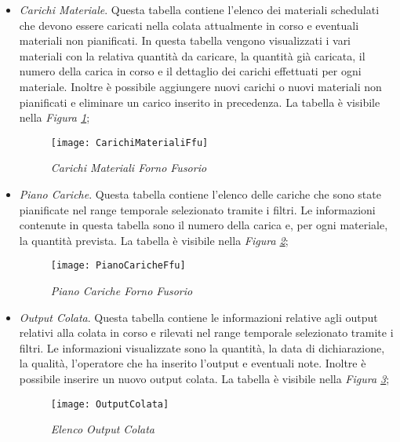   \begin{itemize}
    \item \textit{Carichi Materiale}. Questa tabella contiene l'elenco dei materiali schedulati che devono essere caricati nella
    colata attualmente in corso e eventuali materiali non pianificati. In questa tabella vengono visualizzati i vari materiali
    con la relativa quantità da caricare, la quantità già caricata, il numero della carica in corso e il dettaglio dei
    carichi effettuati per ogni materiale. Inoltre è possibile aggiungere nuovi carichi o nuovi materiali non pianificati e
    eliminare un carico inserito in precedenza. La tabella è visibile nella \textit{Figura \ref{fig:CarichiMaterialiFfu}};

    \begin{figure}[H]
      \texttt{[image: CarichiMaterialiFfu]}
      \centering
      \caption{\textit{Carichi Materiali Forno Fusorio}}
      \label{fig:CarichiMaterialiFfu}
    \end{figure}

    \item \textit{Piano Cariche}. Questa tabella contiene l'elenco delle cariche che sono state pianificate nel range temporale
    selezionato tramite i filtri. Le informazioni contenute in questa tabella sono il numero della carica e, per
    ogni materiale, la quantità prevista. La tabella è visibile nella \textit{Figura \ref{fig:PianoCaricheFfu}};

    \begin{figure}[H]
      \texttt{[image: PianoCaricheFfu]}
      \centering
      \caption{\textit{Piano Cariche Forno Fusorio}}
      \label{fig:PianoCaricheFfu}
    \end{figure}


    \item \textit{Output Colata}. Questa tabella contiene le informazioni relative agli output relativi alla colata in corso
    e rilevati nel range temporale selezionato tramite i filtri. Le informazioni visualizzate sono la quantità,
    la data di dichiarazione, la qualità, l'operatore che ha inserito l'output e eventuali note. Inoltre è possibile
    inserire un nuovo output colata. La tabella è visibile nella \textit{Figura \ref{fig:OutputColata}};

    \begin{figure}[H]
      \texttt{[image: OutputColata]}
      \centering
      \caption{\textit{Elenco Output Colata}}
      \label{fig:OutputColata}
    \end{figure}


\end{itemize}
